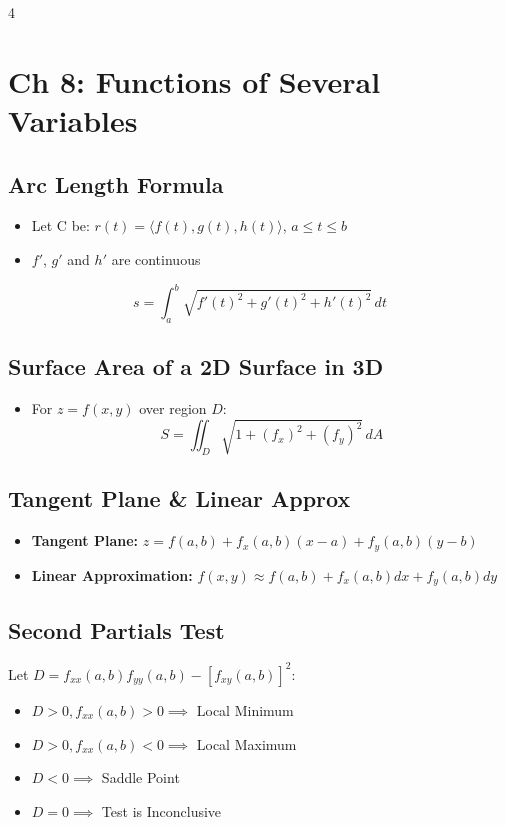 \documentclass[8pt, landscape, a4paper]{scrartcl}
\begin{document}
\begin{multicols*}{4}
\section*{Ch 8: Functions of Several Variables}
    \subsection*{Arc Length Formula}
    \begin{itemize}
        \item Let C be: $r(t) = \langle f(t), g(t), h(t) \rangle$, $a\leq t \leq b$
        \item $f'$, $g'$ and $h'$ are continuous
    \end{itemize}
    \[s = \int_a^b \sqrt{{f'(t)}^2 + {g'(t)}^2 + {h'(t)}^2} \,dt\]

    \subsection*{Surface Area of a 2D Surface in 3D}
    \begin{itemize}
        \item For $z=f(x,y)$ over region $D$:
        \[S = \iint_D \sqrt{1 + \left(f_x\right)^2 + \left(f_y\right)^2}\,dA\]
    \end{itemize}

    \subsection*{Tangent Plane \& Linear Approx}
    \begin{itemize}
        \item \textbf{Tangent Plane:} $z = f(a,b) + f_x (a,b)(x-a) + f_y(a,b)(y - b)$
        \item \textbf{Linear Approximation:} $f(x,y) \approx f(a,b) + f_x(a,b)dx + f_y(a,b)dy$
    \end{itemize}
    
    \subsection*{Second Partials Test}
    Let $D = f_{xx}(a,b)f_{yy}(a,b) - [f_{xy}(a,b)]^2$:
    \begin{itemize}
        \item $D > 0, f_{xx}(a,b) > 0 \implies$ Local Minimum
        \item $D > 0, f_{xx}(a,b) < 0 \implies$ Local Maximum
        \item $D < 0 \implies$ Saddle Point
        \item $D = 0 \implies$ Test is Inconclusive
    \end{itemize}


\end{multicols*}
\end{document}
